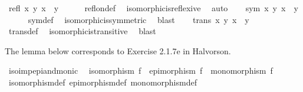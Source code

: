 \begin{isabellebody}
\ {\isachardoublequoteopen}refl\ {\isacharbraceleft}{\kern0pt}{\isacharparenleft}{\kern0pt}x{\isacharcomma}{\kern0pt}\ y{\isacharparenright}{\kern0pt}{\isachardot}{\kern0pt}\ x\ {\isasymcong}\ y{\isacharbraceright}{\kern0pt}{\isachardoublequoteclose}\isanewline
\ \ \ \ \isamarkupfalse%
\ refl{\isacharunderscore}{\kern0pt}on{\isacharunderscore}{\kern0pt}def\ \isamarkupfalse%
\ isomorphic{\isacharunderscore}{\kern0pt}is{\isacharunderscore}{\kern0pt}reflexive\ \isamarkupfalse%
\ auto\isanewline
{}\isamarkupfalse%
\isanewline
\ \ \isamarkupfalse%
\ {\isachardoublequoteopen}sym\ {\isacharbraceleft}{\kern0pt}{\isacharparenleft}{\kern0pt}x{\isacharcomma}{\kern0pt}\ y{\isacharparenright}{\kern0pt}{\isachardot}{\kern0pt}\ x\ {\isasymcong}\ y{\isacharbraceright}{\kern0pt}{\isachardoublequoteclose}\isanewline
\ \ \ \ \isamarkupfalse%
\ sym{\isacharunderscore}{\kern0pt}def\ \isamarkupfalse%
\ isomorphic{\isacharunderscore}{\kern0pt}is{\isacharunderscore}{\kern0pt}symmetric\ \isamarkupfalse%
\ blast\isanewline
{}\isamarkupfalse%
\isanewline
\ \ \isamarkupfalse%
\ {\isachardoublequoteopen}trans\ {\isacharbraceleft}{\kern0pt}{\isacharparenleft}{\kern0pt}x{\isacharcomma}{\kern0pt}\ y{\isacharparenright}{\kern0pt}{\isachardot}{\kern0pt}\ x\ {\isasymcong}\ y{\isacharbraceright}{\kern0pt}{\isachardoublequoteclose}\isanewline
\ \ \ \ \isamarkupfalse%
\ trans{\isacharunderscore}{\kern0pt}def\ \isamarkupfalse%
\ isomorphic{\isacharunderscore}{\kern0pt}is{\isacharunderscore}{\kern0pt}transitive\ \isamarkupfalse%
\ blast\isanewline
{}\isamarkupfalse%
%
\endisatagproof
{\isafoldproof}%
%
\isadelimproof
%
\endisadelimproof
%
\begin{isamarkuptext}%
The lemma below corresponds to Exercise 2.1.7e in Halvorson.%
\end{isamarkuptext}\isamarkuptrue%
\isamarkupfalse%
\ iso{\isacharunderscore}{\kern0pt}imp{\isacharunderscore}{\kern0pt}epi{\isacharunderscore}{\kern0pt}and{\isacharunderscore}{\kern0pt}monic{\isacharcolon}{\kern0pt}\isanewline
\ \ {\isachardoublequoteopen}isomorphism\ f\ {\isasymLongrightarrow}\ epimorphism\ f\ {\isasymand}\ monomorphism\ f{\isachardoublequoteclose}\isanewline
%
\isadelimproof
\ \ %
\endisadelimproof
%
\isatagproof
{}\isamarkupfalse%
\ isomorphism{\isacharunderscore}{\kern0pt}def\ epimorphism{\isacharunderscore}{\kern0pt}def\ monomorphism{\isacharunderscore}{\kern0pt}def\isanewline

\end{isabellebody}
